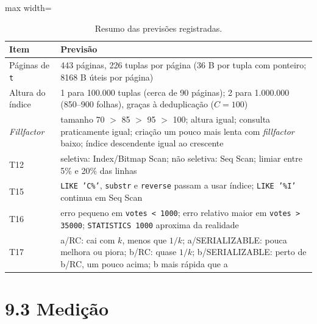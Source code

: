 \documentclass[11pt,a4paper]{article}
\newcommand{\tp}[1]{\texttt{#1}}
\begin{document}
\begin{table}[H]\centering\small
\caption{Resumo das previsões registradas.}\label{tab:prev}
\begin{adjustbox}{max width=\linewidth}\begin{tabular}{lp{11cm}}
\toprule
Item & Previsão \\
\midrule
Páginas de \tp{t} & 443 páginas, 226 tuplas por página (36 B por tupla com ponteiro; 8168 B úteis por página) \\
Altura do índice & 1 para 100.000 tuplas (cerca de 90 páginas); 2 para 1.000.000 (850--900 folhas), graças à deduplicação ($C=100$) \\
\emph{Fillfactor} & tamanho 70 $>$ 85 $>$ 95 $>$ 100; altura igual; consulta praticamente igual; criação um pouco mais lenta com \emph{fillfactor} baixo; índice descendente igual ao crescente \\
T12 & seletiva: Index/Bitmap Scan; não seletiva: Seq Scan; limiar entre 5\% e 20\% das linhas \\
T15 & \tp{LIKE 'C\%'}, \tp{substr} e \tp{reverse} passam a usar índice; \tp{LIKE '\%I'} continua em Seq Scan \\
T16 & erro pequeno em \tp{votes < 1000}; erro relativo maior em \tp{votes > 35000}; \tp{STATISTICS 1000} aproxima da realidade \\
T17 & a/RC: cai com $k$, menos que $1/k$; a/SERIALIZABLE: pouca melhora ou piora; b/RC: quase $1/k$; b/SERIALIZABLE: perto de b/RC, um pouco acima; b mais rápida que a \\
\bottomrule
\end{tabular}\end{adjustbox}
\end{table}

\section*{9.3 Medição}
\end{document}
